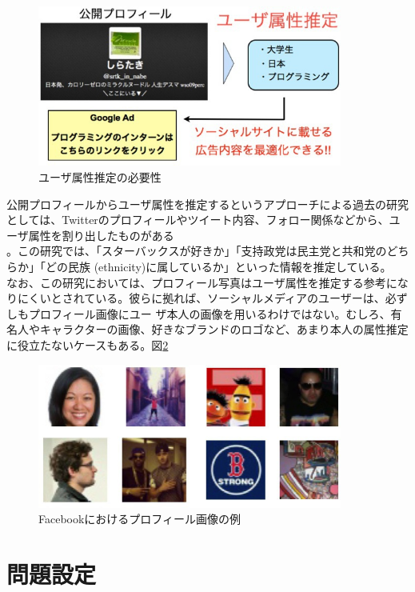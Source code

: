 \begin{figure}[tbp]
 \begin{center}
  \includegraphics[width=100mm]{img/c6/prof2prop}
 \end{center}
 \caption{ユーザ属性推定の必要性}
 \label{c6_prof2prop}
\end{figure}

公開プロフィールからユーザ属性を推定するというアプローチによる過去の研究としては、Twitterのプロフィールやツイート内容、フォロー関係などから、ユーザ属性を割り出したものがある\\\cite{pennacchiotti2011a-machine}。この研究では、「スターバックスが好きか」「支持政党は民主党と共和党のどちらか」「どの民族 (ethnicity)に属しているか」といった情報を推定している。\\なお、この研究においては、プロフィール写真はユーザ属性を推定する参考になりにくいとされている。彼らに拠れば、ソーシャルメディアのユーザーは、必ずしもプロフィール画像にユー
ザ本人の画像を用いるわけではない。むしろ、有名人やキャラクターの画像、好きなブランドのロゴなど、あまり本人の属性推定に役立たないケースもある。図\ref{c6_pic_sample}

\begin{figure}[tbp]
 \begin{center}
  \includegraphics[width=100mm]{img/c6/pic_sample}
 \end{center}
 \caption{Facebookにおけるプロフィール画像の例}
 \label{c6_pic_sample}
\end{figure}

\section{問題設定}

